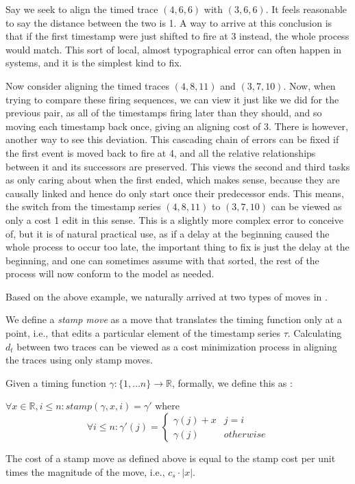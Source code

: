 \documentclass[runningheads]{llncs}
\newcounter{cases}
\begin{document}
	\begin{example}
		Say we seek to align the timed trace $(4,6,6)$ with $(3, 6, 6)$. 
		It feels reasonable to say the distance between the two is 1. 
		A way to arrive at this conclusion is that if the first timestamp  were just shifted to fire at 3 instead, the whole process would match. This sort of local, almost typographical error can often happen in systems, and it is the simplest kind to fix.  
		
		Now consider aligning the timed traces $(4, 8, 11)$ and $(3, 7, 10)$. 
		Now, when trying to compare these firing sequences, we can view it just like we did for the previous pair, as all of the timestamps firing later than they should, and so moving each timestamp back once, giving an aligning cost of 3. There is however, another way to see this deviation. This cascading chain of errors can be fixed if the first event is moved back to fire at 4, and all the relative relationships between it and its successors are preserved. This views the second and third tasks as only caring about when the first ended, which makes sense, because they are causally linked and hence do only start once their predecessor ends. This means, the switch from the timestamp series $(4, 8, 11)$ to $(3, 7, 10)$ can be viewed as only a cost 1 edit in this sense. This is a slightly more complex error to conceive of, but it is of natural practical use, as if a delay at the beginning caused the whole process to occur too late, the important thing to fix is just the delay at the beginning, and one can sometimes assume with that sorted, the rest of the process will now conform to the model as needed. 
	\end{example}
	
	Based on the above example, we naturally arrived at two types of moves in \cite{CR22}.  
	
	We define a \textit{stamp move} as a move that translates the timing function only at a point, i.e., that edits a particular element of the timestamp series $\tau$. 
	Calculating $d_t$ between two traces can be viewed as a cost minimization process in aligning the traces using only stamp moves. 
	
	\begin{definition}
		Given a timing function $\gamma : \{1, \dots n\} \to \mathbb{R}$, formally, we define this as : 
		
		$\forall x \in \mathbb{R}, i \leq n : stamp(\gamma, x, i) =\gamma' $ where
		$$\forall i \leq n : \gamma'(j)  = \begin{cases}
			\gamma(j) + x & j = i \\
			\gamma(j)& otherwise
		\end{cases}$$
		
	\end{definition}
	The cost of a stamp move as defined above is equal to the stamp cost per unit times the magnitude of the move, i.e., $c_s \cdot |x|$. 
\end{document}
